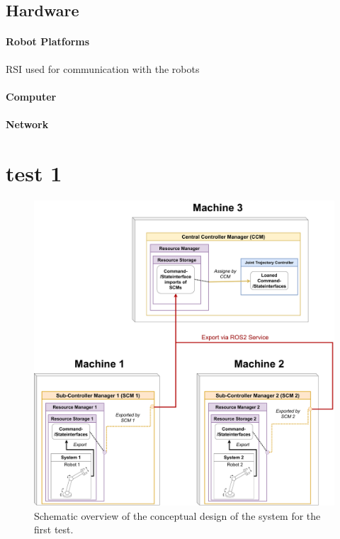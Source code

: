 \subsection{Hardware}
\paragraph{Robot Platforms}
RSI used for communication with the robots
\paragraph{Computer}
\paragraph{Network}
\section{test 1}
\begin{figure}[htbp]
	\centering
	\includegraphics[width=1\textwidth]{Figures/c6/test_scenario_1.drawio.pdf}
	\caption{Schematic overview of the conceptual design of the system for the first test.}
	\label{c6_fig_test_scenario_1}
\end{figure}
